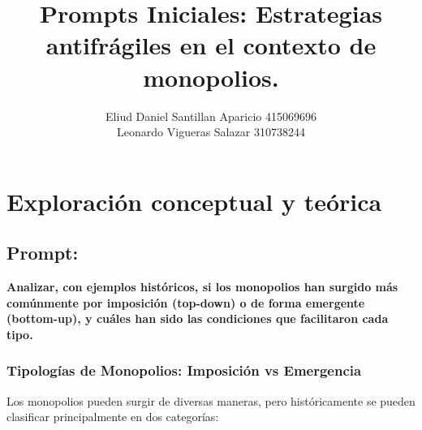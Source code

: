 \documentclass[a4paper,12pt]{article}
\title{\textbf{Prompts Iniciales:} Estrategias antifrágiles en el contexto de monopolios.}
\author{Eliud Daniel Santillan Aparicio 415069696 \\ Leonardo Vigueras Salazar 310738244}
\date{} %
\begin{document}
\maketitle
\section*{Exploración conceptual y teórica}
\subsection*{Prompt: }
\textbf{Analizar, con ejemplos históricos, si los monopolios han surgido más comúnmente por imposición (top-down) o de forma emergente (bottom-up), y cuáles han sido las condiciones que facilitaron cada tipo.}

\subsubsection*{Tipologías de Monopolios: Imposición vs Emergencia}

Los monopolios pueden surgir de diversas maneras, pero históricamente se pueden clasificar principalmente en dos categorías:
\end{document}
